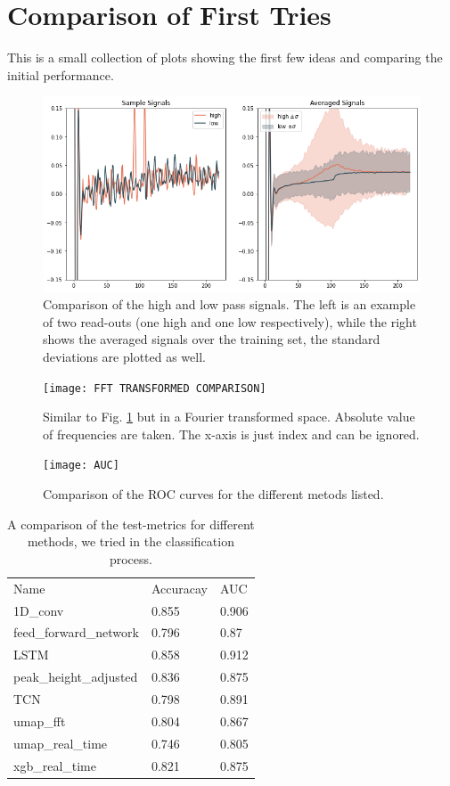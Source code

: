\newpage
\section*{Comparison of First Tries}
This is a small collection of plots showing the first few ideas and comparing the initial performance. 

\begin{figure}[H]
    \centering
    \includegraphics[width = \textwidth]{Figures/johann_first/sample.png}
    \caption{Comparison of the high and low pass signals. The left is an example of two read-outs (one high and one low respectively), while the right shows the averaged signals over the training set, the standard deviations are plotted as well.}
    \label{fig:samples}
\end{figure}



\begin{figure}
    \centering
    \texttt{[image: FFT TRANSFORMED COMPARISON]}
    \caption{Similar to Fig. \ref{fig:samples} but in a Fourier transformed space. Absolute value of frequencies are taken. The x-axis is just index and can be ignored. }
    \label{fig:samples_fft}
\end{figure}

\begin{figure}
    \centering
    \texttt{[image: AUC]}
    \caption{Comparison of the ROC curves for the different metods listed.}
    \label{fig:AUC_comparison}
\end{figure}

\begin{table}[]
\caption{A comparison of the test-metrics for different methods, we tried in the classification process.}
\label{tab:Metric Comparison}
\begin{tabular}{lll}
Name                 & Accuracay & AUC   \\
1D_conv              & 0.855     & 0.906 \\
feed_forward_network & 0.796     & 0.87  \\
LSTM                 & 0.858     & 0.912 \\
peak_height_adjusted & 0.836     & 0.875 \\
TCN                  & 0.798     & 0.891 \\
umap_fft             & 0.804     & 0.867 \\
umap_real_time       & 0.746     & 0.805 \\
xgb_real_time        & 0.821     & 0.875
\end{tabular}
\end{table}